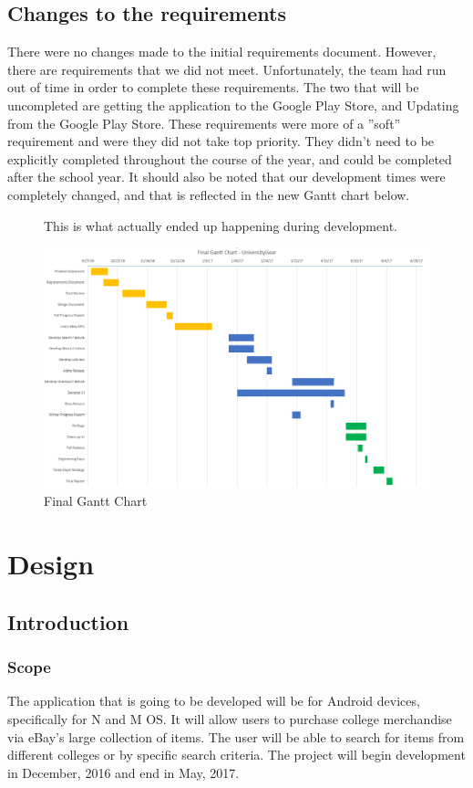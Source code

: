 \documentclass[journal,compsoc, 10pt, draftclsnofoot, onecolumn]{IEEEtran}
\begin{document}
\subsection{Changes to the requirements}
There were no changes made to the initial requirements document. However, 
there are requirements that we did not meet. Unfortunately, the team had run 
out of time in order to complete these requirements. The two that will be 
uncompleted are getting the application to the Google Play Store, and Updating 
from the Google Play Store. These requirements were more of a ''soft'' 
requirement and were they did not take top priority. They didn't need to be 
explicitly completed throughout the course of the year, and could be completed 
after the school year. It should also be noted that our development times were 
completely changed, and that is reflected in the new Gantt chart below.

\begin{figure}[t]
This is what actually ended up happening during development.
\centering
\caption{Final Gantt Chart}
\includegraphics[angle=90,scale=.60]{finalGanttChart}
\end{figure}
\FloatBarrier

\section{Design}
\subsection{Introduction}
\subsubsection{Scope}
The application that is going to be developed will be for Android devices, 
specifically for N and M OS. It will allow users to purchase college merchandise
 via eBay's large collection of items. The user will be able to search for items
 from different colleges or by specific search criteria. The project will begin 
development in December, 2016 and end in May, 2017.
\end{document}
